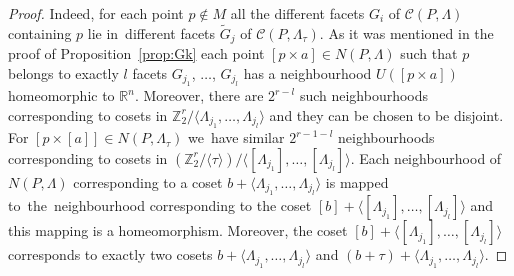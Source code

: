 \documentclass[12pt]{amsart}
\theoremstyle{definition}
\theoremstyle{remark}
\begin{document}
\begin{proof}
Indeed, for each point $p\notin M$ all the different facets $G_i$  of $\mathcal{C}(P,\Lambda)$ containing $p$
lie in~different facets $\widetilde{G}_j$ of $\mathcal{C}(P,\Lambda_\tau)$. As it was mentioned 
in the proof of Proposition~\ref{prop:Gk} each point $[p\times a]\in N(P,\Lambda)$ 
such that $p$ belongs to exactly $l$ facets $G_{j_1}$, $\dots$, $G_{j_l}$
has a neighbourhood $U([p\times a])$ homeomorphic to $\mathbb R^n$. Moreover, there are
$2^{r-l}$ such neighbourhoods corresponding to cosets in 
$\mathbb Z_2^r/\langle \Lambda_{j_1},\dots,\Lambda_{j_l}\rangle$ and they can be chosen to be disjoint.
For $[p\times [a]]\in N(P,\Lambda_\tau)$ we~have similar $2^{r-1-l}$ neighbourhoods corresponding
to cosets in $(\mathbb Z_2^r/\langle\tau\rangle)/\langle [\Lambda_{j_1}],\dots,[\Lambda_{j_l}]\rangle$.
Each neighbourhood of $N(P,\Lambda)$ corresponding to a coset $b+\langle \Lambda_{j_1},\dots,\Lambda_{j_l}\rangle$ 
is mapped to~the~neighbourhood corresponding to the coset 
$[b]+\langle [\Lambda_{j_1}],\dots,[\Lambda_{j_l}]\rangle$ and this mapping is a homeomorphism.
Moreover,  the coset $[b]+\langle [\Lambda_{j_1}],\dots,[\Lambda_{j_l}]\rangle$
corresponds to exactly two cosets $b+\langle \Lambda_{j_1},\dots,\Lambda_{j_l}\rangle$ and 
$(b+\tau)+\langle \Lambda_{j_1},\dots,\Lambda_{j_l}\rangle$.  


\end{proof}
\end{document}
